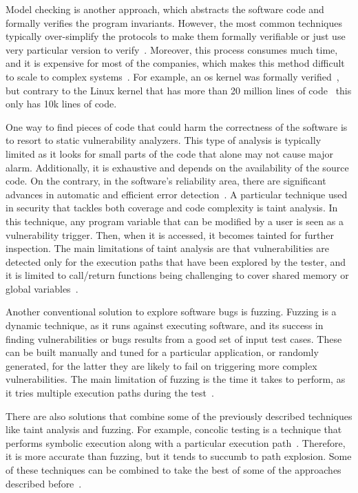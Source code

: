 Model checking is another approach, which abstracts the software code and formally verifies the program invariants.
However, the most common techniques typically over-simplify the protocols to make them formally verifiable or just use very particular version to verify~\cite{Klein:2009,Chen:2015,Nelson:2017}. 
Moreover, this process consumes much time, and it is expensive for most of the companies, which makes this method difficult to scale to complex systems~\cite{Giuffrida:2013}.
For example, an \gls{os} kernel was formally verified~\cite{Klein:2009}, but contrary to the Linux kernel that has more than 20 million lines of code~\cite{linux_kernel} this only has 10k lines of code.


One way to find pieces of code that could harm the correctness of the software is to resort to static vulnerability analyzers.
This type of analysis is typically limited as it looks for small parts of the code that alone may not cause major alarm.
Additionally, it is exhaustive and depends on the availability of the source code.
On the contrary, in the software's reliability area, there are significant advances in automatic and efficient error detection~\cite{Xu:2016}.
A particular technique used in security that tackles both coverage and code complexity is taint analysis.
In this technique, any program variable that can be modified by a user is seen as a vulnerability trigger. 
Then, when it is accessed, it becomes tainted for further inspection.
The main limitations of taint analysis are that vulnerabilities are detected only for the execution paths that have been explored by the tester, and it is limited to call/return functions being challenging to cover shared memory or global variables~\cite{Yamaguchi:2015}.


Another conventional solution to explore software bugs is fuzzing.
Fuzzing is a dynamic technique, as it runs against executing software, and its success in finding vulnerabilities or bugs results from a good set of input test cases.
These can be built manually and tuned for a particular application, or randomly generated, for the latter they are likely to fail on triggering more complex vulnerabilities.
The main limitation of fuzzing is the time it takes to perform, as it tries multiple execution paths during the test~\cite{Gan:2018}.


There are also solutions that combine some of the previously described techniques like taint analysis and fuzzing.
For example, concolic testing is a technique that performs symbolic execution along with a particular execution path~\cite{Kim:2017b}. 
Therefore, it is more accurate than fuzzing, but it tends to succumb to path explosion.
Some of these techniques can be combined to take the best of some of the approaches described before~\cite{Stephens:2016}.


